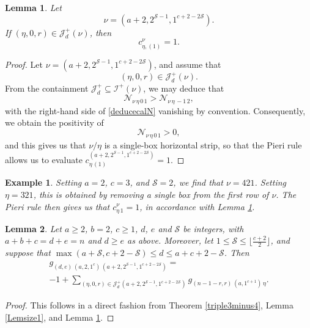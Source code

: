 \documentclass[12pt]{article}
\newtheorem{lemma}{Lemma}%
\newtheorem{example}{Example}
\begin{document}
\begin{lemma}\label{LemLR1}
Let $$ \nu = (a+2, 2^{\mathcal{S} - 1},1^{c+2 - 2 \mathcal{S}}). $$ If $(\eta,0,r) \in \mathcal J_d^{+}(\nu)$, 
 then $$ c_{\eta,(1)}^{\nu}=1. $$
\end{lemma}

\begin{proof}
 Let $\nu = (a+2,2^{\mathcal{S}-1}, 1^{c+2-2\mathcal{S}})$, and assume that $$ (\eta, 0, r) \in \mathcal{J}_{d}^{+}(\nu). $$ From the 
 containment $\mathcal{J}_{d}^{+} \subseteq \mathcal{I}^{+}(\nu)$, we may deduce that
\begin{equation}\label{deducecalN}
 \mathcal{N}_{\nu \, \eta \, 0 \, 1} > \mathcal{N}_{\nu \, \eta \, -1 \, 2}, 
\end{equation}
 with the right-hand side of \eqref{deducecalN} vanishing by convention. Consequently, we obtain the positivity of $$ \mathcal{N}_{\nu \, 
 \eta \, 0 \, 1} > 0, $$ and this gives us that $\nu/\eta$ is a single-box horizontal strip, so that the Pieri rule allows us to evaluate 
 $c_{\eta \, (1)}^{(a + 
 2, 2^{\mathcal{S}-1}, 1^{c+2-2\mathcal{S}})} = 1$. 
\end{proof}

\begin{example}
 Setting $a = 2$, $c = 3$, and $\mathcal{S} = 2$, we find that $\nu = 421$. Setting $\eta = 321$, this is obtained by removing a single box 
 from the first row of $\nu$. The Pieri rule then gives us that $c_{\eta \, 1}^{\nu} = 1$, in accordance with Lemma \ref{LemLR1}. 
\end{example}

\begin{lemma}\label{beforeinterpret}
 Let $a \geq 2$, $b = 2$, $c \geq 1$, $d$, $e$ and $\mathcal{S}$ be integers, with $a+b+c = d + e = n$ and $d \geq e$ as above. 
 Moreover, let $1 \leq \mathcal{S} \leq \lfloor \frac{c+2}{2} \rfloor$, and suppose that $\max(a + \mathcal{S}, c + 2 - \mathcal{S}) \leq 
 d \leq a + c + 2 -\mathcal{S}$. Then 
\begin{multline*}
 g_{(d, e) \, (a, 2, 1^c) \, (a+2, 2^{\mathcal{S}-1}, 1^{c+2-2\mathcal{S}})} = \\ 
 - 1 + \sum_{ (\eta, 0, r) \in \mathcal{J}^{+}_{d}( a+2, 2^{\mathcal{S}-1}, 1^{c+2-2\mathcal{S}} ) } 
 g_{(n - 1 - r,r) \, (a, 1^{c+1}) \, \eta }.
\end{multline*}
\end{lemma}

\begin{proof}
 This follows in a direct fashion from Theorem \ref{triple3minus4}, Lemma \ref{Lemsize1}, and Lemma \ref{LemLR1}. 
\end{proof}
\end{document}
